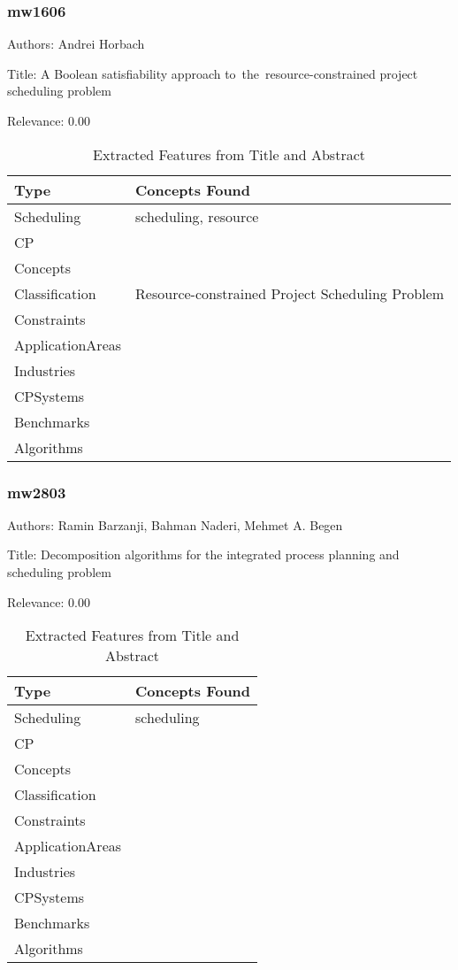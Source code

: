 \subsubsection{mw1606}
\label{mw:mw1606}

Authors: Andrei Horbach

Title: A Boolean satisfiability approach to the resource-constrained project scheduling problem

Relevance:  0.00

{\scriptsize
\begin{longtable}{p{2cm}p{20cm}}
\caption{Extracted Features from Title and Abstract}\\ \toprule
Type & Concepts Found\\ \midrule
\endhead
\bottomrule
\endfoot
Scheduling & scheduling, resource\\ 
CP & \\ 
Concepts & \\ 
Classification & Resource-constrained Project Scheduling Problem\\ 
Constraints & \\ 
ApplicationAreas & \\ 
Industries & \\ 
CPSystems & \\ 
Benchmarks & \\ 
Algorithms & \\ 
\end{longtable}
}



\subsubsection{mw2803}
\label{mw:mw2803}

Authors: Ramin Barzanji, Bahman Naderi, Mehmet A. Begen

Title: Decomposition algorithms for the integrated process planning and scheduling problem

Relevance:  0.00

{\scriptsize
\begin{longtable}{p{2cm}p{20cm}}
\caption{Extracted Features from Title and Abstract}\\ \toprule
Type & Concepts Found\\ \midrule
\endhead
\bottomrule
\endfoot
Scheduling & scheduling\\ 
CP & \\ 
Concepts & \\ 
Classification & \\ 
Constraints & \\ 
ApplicationAreas & \\ 
Industries & \\ 
CPSystems & \\ 
Benchmarks & \\ 
Algorithms & \\ 
\end{longtable}
}



